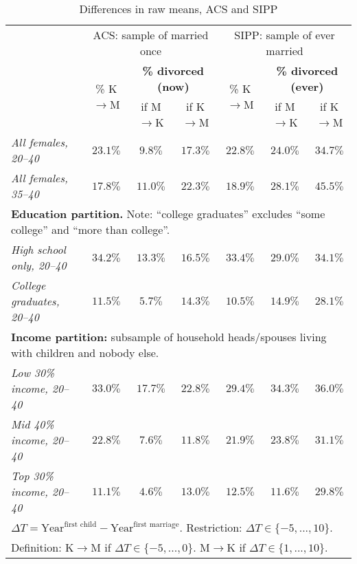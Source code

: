 \documentclass[12pt,letter]{article}
\begin{document}
\begin{table}[h!]
\begin{center}
\begin{tabular}{|l|c||c|c||c||c|c|}\cline{2-7}
\multicolumn{1}{c|}{} & \multicolumn{3}{c||}{\small ACS: sample of married once} & \multicolumn{3}{c|}{\small SIPP: sample of  ever married} \\\cline{2-7}
\multicolumn{1}{c|}{}  & \multirow{2}{*}{\small \% K$\to$M}& \multicolumn{2}{c||}{\textbf{\% divorced (now)}} & \multirow{2}{*}{\footnotesize \% K$\to$M }& \multicolumn{2}{c|}{\textbf{\% divorced (ever)}} \\\cline{3-4}\cline{6-7}
\multicolumn{1}{c|}{}  &  &\small if M$\to$K &  \small if K$\to$M & & \small if M$\to$K & \small if K$\to$M \\\hline
\textit{All females, 20--40}  & $23.1\%$ & $9.8\%$ & $17.3\%$ & $22.8\%$ & $24.0\%$ & $34.7\%$ \\
\textit{All females, 35--40} & $17.8\%$ & $11.0\%$ & $22.3\%$ & $18.9\%$ & $28.1\%$ & $45.5\%$ \\\hline\hline
\multicolumn{7}{|p{0.9\linewidth}|}{\footnotesize \textbf{Education partition.} Note: ``college graduates'' excludes ``some college'' and ``more than college''.}\\\hline
\textit{High school only, 20--40} & $34.2\%$ & $13.3\%$ & $16.5\%$ & $33.4\%$ & $29.0\%$  & $34.1\%$ \\
\textit{College graduates, 20--40} & $11.5\%$ & $5.7\%$ & $14.3\%$ & $10.5\%$ & $14.9\%$ & $28.1\%$ \\\hline\hline
\multicolumn{7}{|p{0.9\linewidth}|}{\footnotesize \textbf{Income partition:} subsample of household heads/spouses living with children and nobody else.}\\\hline
\textit{Low 30\% income, 20--40} & $33.0\%$ & $17.7\%$ & $22.8\%$ & $29.4\%$ & $34.3\%$ &  $36.0\%$ \\
\textit{Mid 40\% income, 20--40} & $22.8\%$ & $7.6\%$ & $11.8\%$ & $21.9\%$ & $23.8\%$ & $31.1\%$ \\
\textit{Top 30\% income, 20--40} & $11.1\%$ & $4.6\%$ & $13.0\%$ & $12.5\%$ & $11.6\%$  & $29.8\%$ \\\hline
\multicolumn{7}{|p{0.9\linewidth}|}{\footnotesize $\Delta T = \text{Year}^{\text{first child}} - \text{Year}^{\text{first marriage}}$. Restriction: $\Delta T \in \{-5,...,10\}$.}\\
\multicolumn{7}{|p{0.9\linewidth}|}{\footnotesize Definition: K$\to$M if $\Delta T \in \{-5,...,0\}$. M$\to$K if $\Delta T \in \{1,...,10\}$.}\\
\hline
\end{tabular}
\caption{Differences in raw means, ACS and SIPP\label{diff-raw}}
\end{center}
\end{table}
\end{document}
